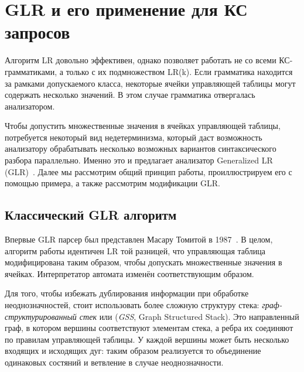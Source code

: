 \section{GLR и его применение для КС запросов}

Алгоритм LR довольно эффективен, однако позволяет работать не со всеми КС-грамматиками, а только с их подмножеством LR(k). Если грамматика находится за рамками допускаемого класса, некоторые ячейки управляющей таблицы могут содержать несколько значений. В этом случае грамматика отвергалась анализатором.

Чтобы допустить множественные значения в ячейках управляющей таблицы, потребуется некоторый вид недетерминизма, который даст возможность анализатору обрабатывать несколько возможных вариантов синтаксического разбора параллельно. Именно это и предлагает анализатор Generalized LR (GLR)~\cite{tomita-1987-efficient}. Далее мы рассмотрим общий принцип работы, проиллюстрируем его с помощью примера, а также рассмотрим модификации GLR.

\subsection{Классический GLR алгоритм}

Впервые GLR парсер был представлен Масару Томитой в 1987~\cite{tomita-1987-efficient}. В целом, алгоритм работы идентичен LR той разницей, что управляющая таблица модифицирована таким образом, чтобы допускать множественные значения в ячейках. Интерпретатор автомата изменён соответствующим образом.

Для того, чтобы избежать дублирования информации при обработке неоднозначностей, стоит использовать более сложную структуру стека: \textit{граф-структурированный стек} или (\textit{GSS}, Graph Structured Stack). Это направленный граф, в котором вершины соответствуют элементам стека, а ребра их соединяют по правилам управляющей таблицы. У каждой вершины может быть несколько входящих и исходящих дуг: таким образом реализуется то объединение одинаковых состяний и ветвление в случае неоднозначности.

